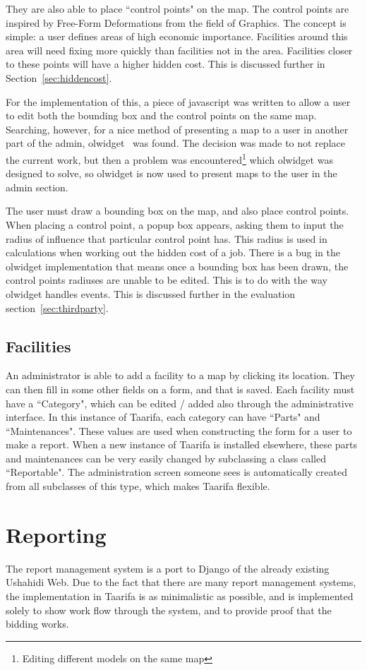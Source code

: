 They are also able to place ``control points" on the map. The control points are inspired by Free-Form Deformations from the field of Graphics. The concept is simple: a user defines areas of high economic importance. Facilities around this area will need fixing more quickly than facilities not in the area. Facilities closer to these points will have a higher hidden cost. This is discussed further in Section~\ref{sec:hiddencost}.

For the implementation of this, a piece of javascript was written to allow a user to edit both the bounding box and the control points on the same map. Searching, however, for a nice method of presenting a map to a user in another part of the admin, olwidget~\cite{olwidget} was found. The decision was made to not replace the current work, but then a problem was encountered\footnote{Editing different models on the same map} which olwidget was designed to solve, so olwidget is now used to present maps to the user in the admin section.

The user must draw a bounding box on the map, and also place control points. When placing a control point, a popup box appears, asking them to input the radius of influence that particular control point has. This radius is used in calculations when working out the hidden cost of a job. There is a bug in the olwidget implementation that means once a bounding box has been drawn, the control points radiuses are unable to be edited. This is to do with the way olwidget handles events. This is discussed further in the evaluation section~\ref{sec:thirdparty}.

\subsection{Facilities}
An administrator is able to add a facility to a map by clicking its location. They can then fill in some other fields on a form, and that is saved. Each facility must have a ``Category", which can be edited / added also through the administrative interface. In this instance of Taarifa, each category can have ``Parts" and ``Maintenances". These values are used when constructing the form for a user to make a report. When a new instance of Taarifa is installed elsewhere, these parts and maintenances can be very easily changed by subclassing a class called ``Reportable". The administration screen someone sees is automatically created from all subclasses of this type, which makes Taarifa flexible.

\section{Reporting}
The report management system is a port to Django of the already existing Ushahidi Web. Due to the fact that there are many report management systems, the implementation in Taarifa is as minimalistic as possible, and is implemented solely to show work flow through the system, and to provide proof that the bidding works.

